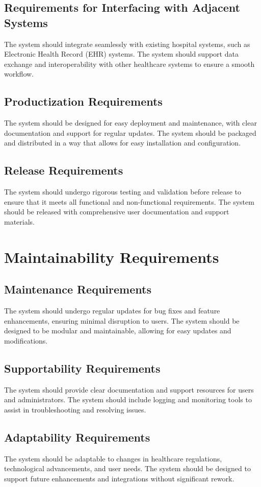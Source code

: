 \documentclass[12pt]{article}
\begin{document}
\subsection{Requirements for Interfacing with Adjacent Systems}
The system should integrate seamlessly with existing hospital systems, such as Electronic Health Record (EHR) systems. The system should support data exchange and interoperability with other healthcare systems to ensure a smooth workflow.

\subsection{Productization Requirements}
The system should be designed for easy deployment and maintenance, with clear documentation and support for regular updates. The system should be packaged and distributed in a way that allows for easy installation and configuration.

\subsection{Release Requirements}
The system should undergo rigorous testing and validation before release to ensure that it meets all functional and non-functional requirements. The system should be released with comprehensive user documentation and support materials.

\section{Maintainability Requirements}
\subsection{Maintenance Requirements}
The system should undergo regular updates for bug fixes and feature enhancements, ensuring minimal disruption to users. The system should be designed to be modular and maintainable, allowing for easy updates and modifications.

\subsection{Supportability Requirements}
The system should provide clear documentation and support resources for users and administrators. The system should include logging and monitoring tools to assist in troubleshooting and resolving issues.

\subsection{Adaptability Requirements}
The system should be adaptable to changes in healthcare regulations, technological advancements, and user needs. The system should be designed to support future enhancements and integrations without significant rework.
\end{document}

